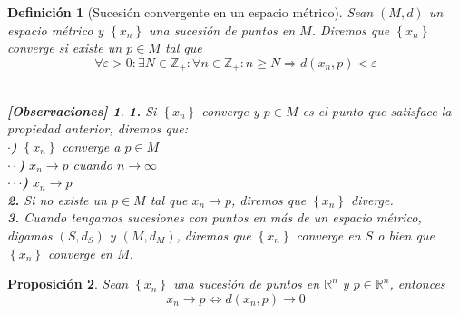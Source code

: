 \documentclass[oneside]{book} %
\theoremstyle{Teorema}
\newtheorem{Definicion}{Definición}[chapter]
\newtheorem{Proposicion}[Definicion]{Proposición}
\theoremstyle{Ejemplos}
\theoremstyle{[Obs]}
\newtheorem*{Obs}{[Observaciones]}
\renewcommand{\{}{\left\lbrace} %
\renewcommand{\}}{\right\rbrace} %
\newcommand{\Rn}{\mathbb{R}^n} %
\begin{document}
			\begin{Definicion}[Sucesión convergente en un espacio métrico]

				Sean $(M, d)$ un espacio métrico y $\{ x_n \}$ una sucesión de puntos en $M$. Diremos que $\{ x_n \}$ converge si existe un $p \in M$ tal que \\

				\[ \forall \varepsilon > 0 : \exists N \in \mathbb{Z}_{+} : \forall n \in \mathbb{Z}_{+} : n \geq N \Rightarrow d(x_n, p) < \varepsilon \] \\

				\begin{Obs}
				
					\hfill
				
					\textbf{1.} Si $\{ x_n \}$ converge y $p \in M$ es el punto que satisface la propiedad anterior, diremos que: \\
					
					\hspace{1cm}\textbf{$\cdot$)} $\{ x_n \}$ converge a $p \in M$ \\
				
					\hspace{1cm}\textbf{$\cdot \cdot$)} $x_n \to p$ cuando $n \to \infty$ \\

					\hspace{1cm}\textbf{$\cdot \cdot \cdot$)} $x_n \to p$ \\

					\textbf{2.} Si no existe un $p \in M$ tal que $x_n \to p$, diremos que $\{ x_n \}$ diverge. \\

					\textbf{3.} Cuando tengamos sucesiones con puntos en más de un espacio métrico, digamos $(S, d_S)$ y $(M, d_M)$, diremos que $\{ x_n \}$ converge en $S$ o bien que $\{ x_n \}$ converge en $M$. \\

				\end{Obs}
				
			\end{Definicion}

			\begin{Proposicion}
				
				Sean $\{ x_n \}$ una sucesión de puntos en $\Rn$ y $p \in \Rn$, entonces \\

				\[ x_n \to p \Leftrightarrow d(x_n, p) \to 0 \] \\

			\end{Proposicion}
\end{document}
